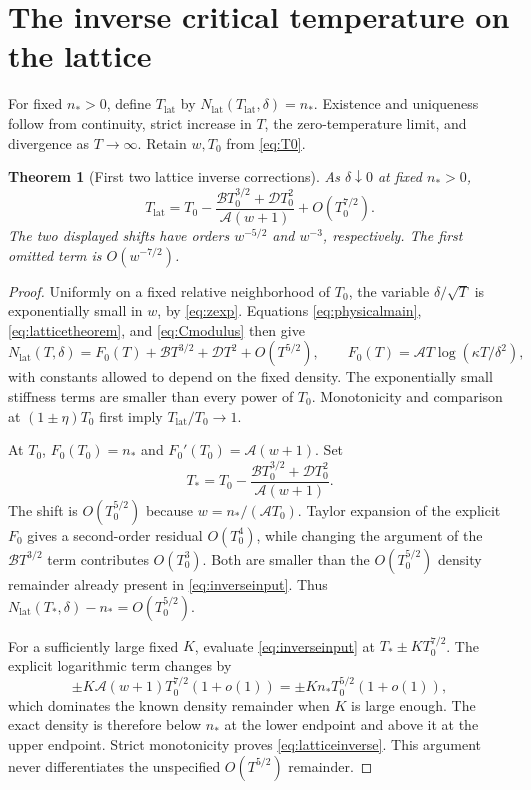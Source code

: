 \documentclass[11pt,a4paper]{article}
\numberwithin{equation}{section}
\newtheorem{theorem}{Theorem}[section]
\theoremstyle{definition}
\newcommand{\latt}{\mathrm{lat}}
\newcommand{\Aconst}{\mathcal A}
\newcommand{\Bconst}{\mathcal B}
\newcommand{\Dconst}{\mathcal D}
\begin{document}
\section{The inverse critical temperature on the lattice}
\label{sec:latticeinverse}

For fixed $n_*>0$, define $T_{\latt}$ by
$N_{\latt}(T_{\latt},\delta)=n_*$. Existence and uniqueness follow from
continuity, strict increase in $T$, the zero-temperature limit, and
divergence as $T\to\infty$. Retain $w,T_0$ from \eqref{eq:T0}.

\begin{theorem}[First two lattice inverse corrections]
\label{thm:latticeinverse}
As $\delta\downarrow0$ at fixed $n_*>0$,
\begin{equation}
 \boxed{T_{\latt}=T_0-
 \frac{\Bconst T_0^{3/2}+\Dconst T_0^2}{\Aconst(w+1)}
 +O(T_0^{7/2}).}
 \label{eq:latticeinverse}
\end{equation}
The two displayed shifts have orders $w^{-5/2}$ and $w^{-3}$,
respectively. The first omitted term is $O(w^{-7/2})$.
\end{theorem}

\begin{proof}
Uniformly on a fixed relative neighborhood of $T_0$, the variable
$\delta/\sqrt T$ is exponentially small in $w$, by \eqref{eq:zexp}.
Equations \eqref{eq:physicalmain}, \eqref{eq:latticetheorem}, and
\eqref{eq:Cmodulus} then give
\begin{equation}
 N_{\latt}(T,\delta)=F_0(T)+\Bconst T^{3/2}+\Dconst T^2+O(T^{5/2}),
 \qquad F_0(T)=\Aconst T\log(\kappa T/\delta^2),
 \label{eq:inverseinput}
\end{equation}
with constants allowed to depend on the fixed density. The exponentially
small stiffness terms are smaller than every power of $T_0$.
Monotonicity and comparison at $(1\pm\eta)T_0$ first imply
$T_{\latt}/T_0\to1$.

At $T_0$, $F_0(T_0)=n_*$ and $F_0'(T_0)=\Aconst(w+1)$.
Set
\[
 T_*=T_0-\frac{\Bconst T_0^{3/2}+\Dconst T_0^2}
                         {\Aconst(w+1)}.
\]
The shift is $O(T_0^{5/2})$ because $w=n_*/(\Aconst T_0)$.
Taylor expansion of the explicit $F_0$ gives a second-order residual
$O(T_0^4)$, while changing the argument of the $\Bconst T^{3/2}$
term contributes $O(T_0^3)$. Both are smaller than the
$O(T_0^{5/2})$ density remainder already present in
\eqref{eq:inverseinput}. Thus $N_{\latt}(T_*,\delta)-n_*=O(T_0^{5/2})$.

For a sufficiently large fixed $K$, evaluate \eqref{eq:inverseinput}
at $T_*\pm K T_0^{7/2}$. The explicit logarithmic term changes by
\[
 \pm K\Aconst(w+1)T_0^{7/2}(1+o(1))
 =\pm K n_*T_0^{5/2}(1+o(1)),
\]
which dominates the known density remainder when $K$ is large enough.
The exact density is therefore below $n_*$ at the lower endpoint and
above it at the upper endpoint. Strict monotonicity proves
\eqref{eq:latticeinverse}. This argument never differentiates the
unspecified $O(T^{5/2})$ remainder.
\end{proof}
\end{document}
